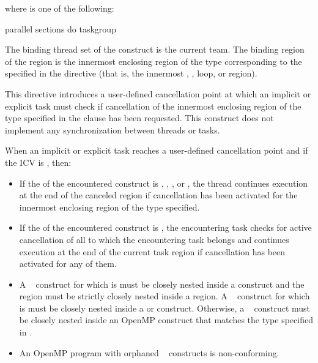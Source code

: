 where  is one of the following:

\begin{indentedcodelist}
parallel
sections
do
taskgroup
\end{indentedcodelist}
\fortranspecificend

\binding
The binding thread set of the  construct is the current team.
The binding region of the  region is the innermost enclosing region of the type corresponding to the  
specified in the directive (that is, the innermost , , loop, or 
 region).

\descr
This directive introduces a user-defined cancellation point at which an implicit or 
explicit task must check if cancellation of the innermost enclosing region of the type 
specified in the clause has been requested. This construct does not implement any 
synchronization between threads or tasks.

When an implicit or explicit task reaches a user-defined cancellation point and if 
the  ICV is , then:
\begin{itemize}
\item If the  of the encountered  construct is , , , or ,
the thread continues execution at the end of the canceled region if 
cancellation has been activated for the innermost enclosing region of 
the type specified.

\item If the  of the encountered 
 construct is , the encountering 
task checks for active cancellation of all   to which the 
encountering task belongs and continues execution at the end of the current 
task region if cancellation has been activated for any of them.
\end{itemize}

\restrictions
\begin{itemize}
\item A ~ construct for which
 is  must be closely nested
inside a  construct and the ~
region must be strictly closely nested inside a  region. A
~ construct for which
 is  must be closely nested
inside a  or  construct. Otherwise, a
~ construct must be closely nested inside
an OpenMP construct that matches the type specified in
.

\item An OpenMP program with orphaned ~ constructs is 
non-conforming. 
\end{itemize}

